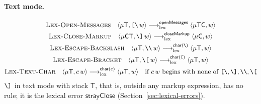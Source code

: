 \documentclass[11pt]{article}
\numberwithin{equation}{section}
\newcommand{\kw}[1]{\ensuremath{\mathsf{#1}}}
\newcommand{\str}[1]{\ensuremath{\text{\texttt{#1}}}}
\newcommand{\bs}{\textbackslash}
\newcommand{\Open}{\str{[\bs}}
\newcommand{\Close}{\str{\bs]}}
\newcommand{\TM}{\kw{T}}
\newcommand{\CM}{\kw{C}}
\newcommand{\lexto}{\longrightarrow_{\mathrm{lex}}}
\newcommand{\rulelabel}[1]{\textsc{#1}}
\begin{document}
\paragraph{Text mode.}
\begin{gather}
\label{eq:lex-open-messages}
\rulelabel{Lex-Open-Messages}\quad
\langle \mu\TM, \Open\,w \rangle \lexto^{\kw{openMessages}}
  \langle \mu\TM\CM, w \rangle
\\
\label{eq:lex-close-markup}
\rulelabel{Lex-Close-Markup}\quad
\langle \mu\CM\TM, \Close\,w \rangle \lexto^{\kw{closeMarkup}}
  \langle \mu\CM, w \rangle
\\
\label{eq:lex-escape-backslash}
\rulelabel{Lex-Escape-Backslash}\quad
\langle \mu\TM, \str{\bs\bs}\,w \rangle \lexto^{\kw{char}(\str{\bs})}
  \langle \mu\TM, w \rangle
\\
\label{eq:lex-escape-bracket}
\rulelabel{Lex-Escape-Bracket}\quad
\langle \mu\TM, \str{\bs[}\,w \rangle \lexto^{\kw{char}(\str{[})}
  \langle \mu\TM, w \rangle
\\
\label{eq:lex-text-char}
\rulelabel{Lex-Text-Char}\quad
\langle \mu\TM, c\,w \rangle \lexto^{\kw{char}(c)}
  \langle \mu\TM, w \rangle
  \quad\text{if } c\,w \text{ begins with none of }
  \Open, \Close, \str{\bs\bs}, \str{\bs[}
\end{gather}
$\Close$ in text mode with stack $\TM$, that is, outside any markup
expression, has no rule; it is the lexical error
$\kw{strayClose}$ (Section~\ref{sec:lexical-errors}).
\end{document}
